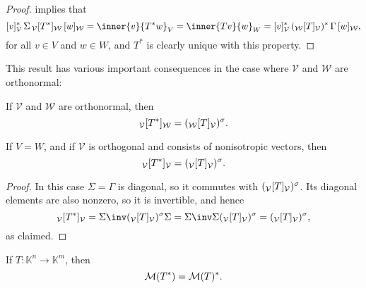 \documentclass[a4paper, 11pt]{memoir}
\theoremstyle{plaincustomnumber}
\theoremstyle{changedotbreakcustomnumber}
\newcommand{\calV}{\mathcal{V}}
\newcommand{\calW}{\mathcal{W}}
\newcommand{\fieldK}{\mathbb{K}}
\begin{document}
\begin{proof}
     implies that
    \begin{equation*}
        \coordvec{v}{\calV}^* \, \Sigma \, \mr{\calV}{T^*}{\calW} \, \coordvec{w}{\calW}
            = \inner{v}{T^* w}_V
            = \inner{Tv}{w}_W
            = \coordvec{v}{\calV}^* \, (\mr{\calW}{T}{\calV})^* \, \Gamma \, \coordvec{w}{\calW},
    \end{equation*}
    for all $v \in V$ and $w \in W$, and $T^*$ is clearly unique with this property.
\end{proof}
%
This result has various important consequences in the case where $\calV$ and $\calW$ are orthonormal:

\begin{corollarynoproof}
    If $\calV$ and $\calW$ are orthonormal, then
    \begin{equation*}
        \mr{\calV}{T^*}{\calW}
            = (\mr{\calW}{T}{\calV})^\sigma.
    \end{equation*}
\end{corollarynoproof}

\begin{corollary}
    \label{cor:adjoint-mr-orthogonal-basis}
    If $V = W$, and if $\calV$ is orthogonal and consists of nonisotropic vectors, then
    \begin{equation*}
        \mr{\calV}{T^*}{\calV}
            = (\mr{\calV}{T}{\calV})^\sigma.
    \end{equation*}
\end{corollary}

\begin{proof}
    In this case $\Sigma = \Gamma$ is diagonal, so it commutes with $(\mr{\calV}{T}{\calV})^\sigma$. Its diagonal elements are also nonzero, so it is invertible, and hence
    \begin{equation*}
        \mr{\calV}{T^*}{\calV}
            = \Sigma\inv (\mr{\calV}{T}{\calV})^\sigma \Sigma
            = \Sigma\inv \Sigma (\mr{\calV}{T}{\calV})^\sigma
            = (\mr{\calV}{T}{\calV})^\sigma,
    \end{equation*}
    as claimed.
\end{proof}


\begin{corollarynoproof}
    If $T \colon \fieldK^n \to \fieldK^m$, then
    \begin{equation*}
        \mathcal{M}(T^*)
            = \mathcal{M}(T)^*.
    \end{equation*}
\end{corollarynoproof}
\end{document}
